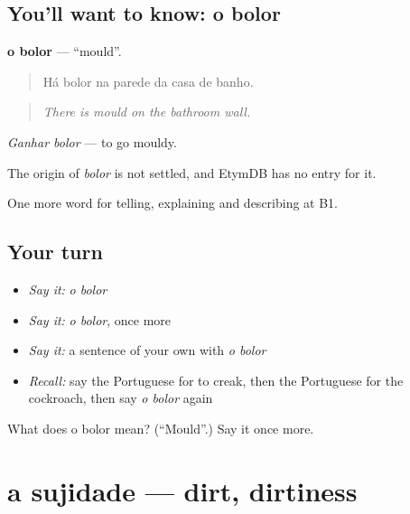 \subsection*{You'll want to know: o bolor}
\textbf{o bolor} — \textquotedblleft{}mould\textquotedblright{}.

\begin{quote}
Há bolor na parede da casa de banho.
\end{quote}

\begin{quote}
\emph{There is mould on the bathroom wall.}
\end{quote}

\emph{Ganhar bolor} — to go mouldy.

\begin{cousinweb}
The origin of \emph{bolor} is not settled, and EtymDB has no entry for it.
\end{cousinweb}

\begin{grammarlens}[title={What you've built}]
One more word for telling, explaining and describing at B1.
\end{grammarlens}

\subsection*{Your turn}
\begin{itemize}
\raggedright
  \item \emph{Say it:} \emph{o bolor}
  \item \emph{Say it:} \emph{o bolor}, once more
  \item \emph{Say it:} a sentence of your own with \emph{o bolor}
  \item \emph{Recall:} say the Portuguese for to creak, then the Portuguese for the cockroach, then say \emph{o bolor} again
\end{itemize}

\begin{tcolorbox}[breakable,colback=teal!4,colframe=teal!35!black,title={Before you move on}]
What does o bolor mean? (\textquotedblleft{}Mould\textquotedblright{}.) Say it once more.
\end{tcolorbox}
\section[a sujidade]{a sujidade — dirt, dirtiness}

\label{lesson:PT-C433-sujidade}



